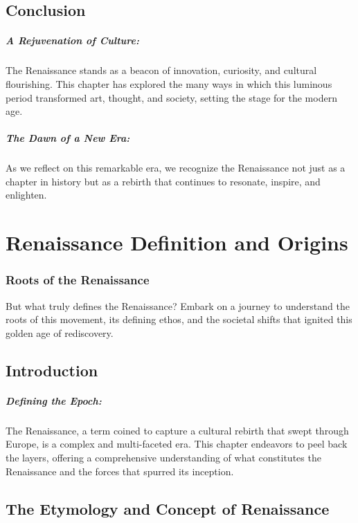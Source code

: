 \documentclass{book}
\begin{document}
\section*{Conclusion}

\paragraph{A Rejuvenation of Culture:}
The Renaissance stands as a beacon of innovation, curiosity, and cultural flourishing. This chapter has explored the many ways in which this luminous period transformed art, thought, and society, setting the stage for the modern age.

\paragraph{The Dawn of a New Era:}
As we reflect on this remarkable era, we recognize the Renaissance not just as a chapter in history but as a rebirth that continues to resonate, inspire, and enlighten.

\chapter{Renaissance Definition and Origins}
\subsection*{Roots of the Renaissance}
But what truly defines the Renaissance? Embark on a journey to understand the roots of this movement, its defining ethos, and the societal shifts that ignited this golden age of rediscovery.

\section*{Introduction}

\paragraph{Defining the Epoch:}
The Renaissance, a term coined to capture a cultural rebirth that swept through Europe, is a complex and multi-faceted era. This chapter endeavors to peel back the layers, offering a comprehensive understanding of what constitutes the Renaissance and the forces that spurred its inception.

\section*{The Etymology and Concept of Renaissance}
\end{document}
